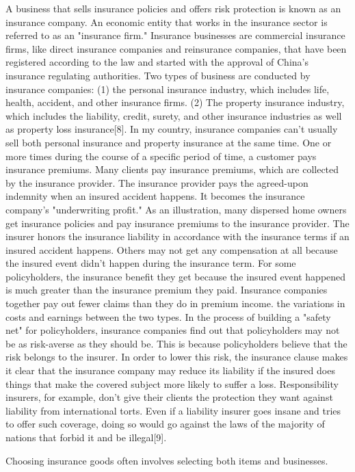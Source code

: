 \documentclass[journal]{IEEEtran}
\begin{document}
A business that sells insurance policies and offers risk protection is known as an insurance company. An economic entity that works in the insurance sector is referred to as an "insurance firm." Insurance businesses are commercial insurance firms, like direct insurance companies and reinsurance companies, that have been registered according to the law and started with the approval of China's insurance regulating authorities. Two types of business are conducted by insurance companies: (1) the personal insurance industry, which includes life, health, accident, and other insurance firms. (2) The property insurance industry, which includes the liability, credit, surety, and other insurance industries as well as property loss insurance[8]. In my country, insurance companies can't usually sell both personal insurance and property insurance at the same time. One or more times during the course of a specific period of time, a customer pays insurance premiums. Many clients pay insurance premiums, which are collected by the insurance provider. The insurance provider pays the agreed-upon indemnity when an insured accident happens. It becomes the insurance company's "underwriting profit." As an illustration, many dispersed home owners get insurance policies and pay insurance premiums to the insurance provider. The insurer honors the insurance liability in accordance with the insurance terms if an insured accident happens. Others may not get any compensation at all because the insured event didn't happen during the insurance term. For some policyholders, the insurance benefit they get because the insured event happened is much greater than the insurance premium they paid. Insurance companies together pay out fewer claims than they do in premium income. the variations in costs and earnings between the two types. In the process of building a "safety net" for policyholders, insurance companies find out that policyholders may not be as risk-averse as they should be. This is because policyholders believe that the risk belongs to the insurer. In order to lower this risk, the insurance clause makes it clear that the insurance company may reduce its liability if the insured does things that make the covered subject more likely to suffer a loss.
Responsibility insurers, for example, don't give their clients the protection they want against liability from international torts. Even if a liability insurer goes insane and tries to offer such coverage, doing so would go against the laws of the majority of nations that forbid it and be illegal[9].
\par Choosing insurance goods often involves selecting both items and businesses.
\end{document}
